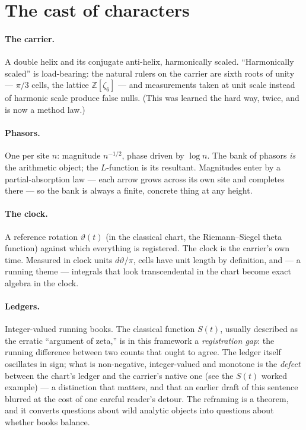 \documentclass[11pt]{article}
\begin{document}
\section{The cast of characters}

\paragraph{The carrier.}  A double helix and its conjugate anti-helix,
harmonically scaled.  ``Harmonically scaled'' is load-bearing: the natural rulers
on the carrier are sixth roots of unity --- $\pi/3$ cells, the lattice
$\mathbb Z[\zeta_6]$ --- and measurements taken at unit scale instead of harmonic
scale produce false nulls.  (This was learned the hard way, twice, and is now a
method law.)

\paragraph{Phasors.}  One per site $n$: magnitude $n^{-1/2}$, phase driven by
$\log n$.  The bank of phasors \emph{is} the arithmetic object; the $L$-function
is its resultant.  Magnitudes enter by a partial-absorption law --- each arrow
grows across its own site and completes there --- so the bank is always a finite,
concrete thing at any height.

\paragraph{The clock.}  A reference rotation $\vartheta(t)$ (in the classical
chart, the Riemann--Siegel theta function) against which everything is registered.
The clock is the carrier's own time.  Measured in clock units $d\vartheta/\pi$,
cells have unit length by definition, and --- a running theme --- integrals that
look transcendental in the chart become exact algebra in the clock.

\paragraph{Ledgers.}  Integer-valued running books.  The classical function
$S(t)$, usually described as the erratic ``argument of zeta,'' is in this
framework a \emph{registration gap}: the running difference between two counts
that ought to agree.  The ledger itself oscillates in sign; what is
non-negative, integer-valued and monotone is the \emph{defect} between the
chart's ledger and the carrier's native one (see the $S(t)$ worked example) ---
a distinction that matters, and that an earlier draft of this sentence blurred
at the cost of one careful reader's detour.  The reframing is a theorem, and it
converts questions about wild analytic objects into questions about whether
books balance.
\end{document}
